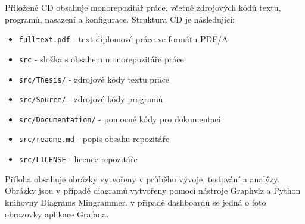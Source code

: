 
\listofappendices


Přiložené CD obsahuje monorepozitář práce, včetně zdrojových kódů textu, programů, nasazení a konfigurace. Struktura CD je následující:

\begin{itemize}
    \item \texttt{fulltext.pdf} - text diplomové práce ve formátu PDF/A
    \item \texttt{src} - složka s obsahem monorepozitáře práce
    \item \texttt{src/Thesis/} - zdrojové kódy textu práce
    \item \texttt{src/Source/} - zdrojové kódy programů
    \item \texttt{src/Documentation/} - pomocné kódy pro dokumentaci
    \item \texttt{src/readme.md} - popis obsahu repozitáře
    \item \texttt{src/LICENSE} - licence repozitáře
\end{itemize}


Příloha obsahuje obrázky vytvořeny v průběhu vývoje, testování a analýzy. Obrázky jsou v případě diagramů vytvořeny pomocí nástroje Graphviz a Python knihovny Diagrams Mingrammer. v případě dashboardů se jedná o foto obrazovky aplikace Grafana.\\







